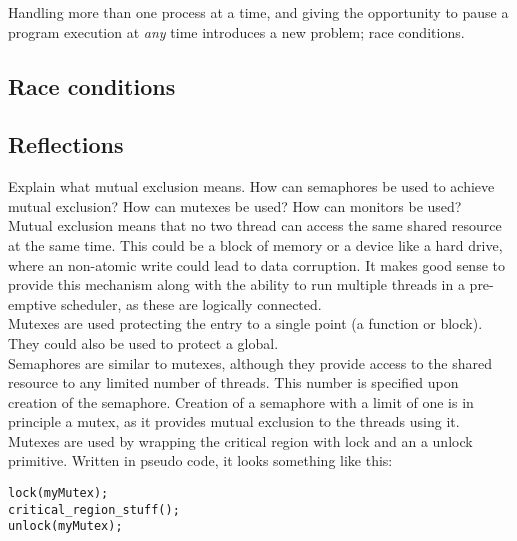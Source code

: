Handling more than one process at a time, and giving the opportunity to pause a program execution at \emph{any} time introduces a new problem; race conditions.\\
\subsection{Race conditions}


\subsection{Reflections}
Explain what mutual exclusion means. How can semaphores be used to achieve
mutual exclusion? How can mutexes be used? How can monitors be used?\\

Mutual exclusion means that no two thread can access the same shared resource at the same time. This could be a block of memory or a device like a hard drive, where an non-atomic write could lead to data corruption. It makes good sense to provide this mechanism along with the ability to run multiple threads in a pre-emptive scheduler, as these are logically connected.\\
Mutexes are used protecting the entry to a single point (a function or block). They could also be used to protect a global.\\
Semaphores are similar to mutexes, although they provide access to the shared resource to any limited number of threads. This number is specified upon creation of the semaphore. Creation of a semaphore with a limit of one is in principle a mutex, as it provides mutual exclusion to the threads using it.\\
Mutexes are used by wrapping the critical region with lock and an a unlock primitive. Written in pseudo code, it looks something like this:
\begin{lstlisting}[basicstyle={\small}]
lock(myMutex);
critical_region_stuff();
unlock(myMutex);
\end{lstlisting}


